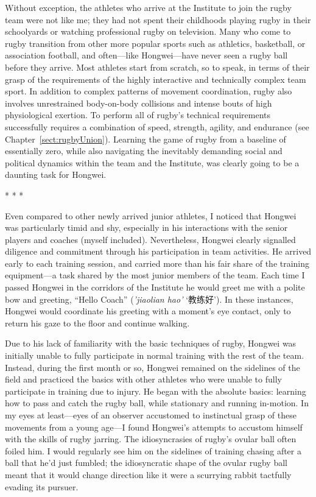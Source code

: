 \begin{CJK}{UTF8}{gbsn}
Without exception, the athletes who arrive at the Institute to join the rugby team were not like me; they had not spent their childhoods playing rugby in their schoolyards or watching professional rugby on television. Many who come to rugby transition from other more popular sports such as athletics, basketball, or association football, and often---like Hongwei---have never seen a rugby ball before they arrive.  Most athletes start from scratch, so to speak, in terms of their grasp of the requirements of the highly interactive and technically complex team sport.  In addition to complex patterns of movement coordination, rugby also involves unrestrained body-on-body collisions and intense bouts of high physiological exertion.  To perform all of rugby’s technical requirements successfully requires a combination of speed, strength, agility, and endurance (see Chapter~\ref{sect:rugbyUnion}).  Learning the game of rugby from a baseline of essentially zero, while also navigating the inevitably demanding social and political dynamics within the team and the Institute, was clearly going to be a daunting task for Hongwei.


                        \begin{center}
                          * * *
                        \end{center}

 Even compared to other newly arrived junior athletes, I noticed that Hongwei was particularly timid and shy, especially in his interactions with the senior players and coaches (myself included).  Nevertheless, Hongwei clearly signalled diligence and commitment through his participation in team activities.  He arrived early to each training session, and carried more than his fair share of the training equipment---a task shared by the most junior members of the team.  Each time I passed Hongwei in the corridors of the Institute he would greet me with a polite bow and greeting, ``Hello Coach'' (\textit{'jiaolian hao'} `教练好').  In these instances, Hongwei would coordinate his greeting with a moment's eye contact, only to return his gaze to the floor and continue walking.

Due to his lack of familiarity with the basic techniques of rugby, Hongwei was initially unable to fully participate in normal training with the rest of the team.  Instead, during the first month or so, Hongwei remained on the sidelines of the field and practiced the basics with other athletes who were unable to fully participate in training due to injury. He began with the absolute basics: learning how to pass and catch the rugby ball, while stationary and running in-motion. In my eyes at least---eyes of an observer accustomed to instinctual grasp of these movements from a young age---I found Hongwei’s attempts to accustom himself with the skills of rugby jarring. The idiosyncrasies of rugby’s ovular ball often foiled him.  I would regularly see him on the sidelines of training chasing after a ball that he’d just fumbled; the idiosyncratic shape of the ovular rugby ball meant that it would change direction like it were a scurrying rabbit tactfully evading its pursuer.


\end{CJK}
